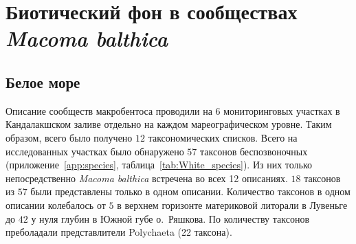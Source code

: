 		\chapter{Биотический фон в сообществах {\it Macoma balthica}}

	\section{Белое море}
Описание сообществ макробентоса проводили на 6 мониторинговых участках в Кандалакшском заливе отдельно на каждом мареографическом уровне. 
Таким образом, всего было получено $12$ таксономических списков.
Всего на  исследованных участках было обнаружено $57$ таксонов беспозвоночных (приложение~\ref{app:species}, таблица~\ref{tab:White_species}).
Из них только непосредственно {\it Macoma balthica} встречена во всех 12 описаниях.
$18$ таксонов из $57$ были представлены только в одном описании.
Количество таксонов в одном описании колебалось от $5$ в верхнем горизонте материковой литорали в Лувеньге до $42$ у нуля глубин в Южной губе о.~Ряшкова.
По количеству таксонов преболадали представлители Polychaeta (22 таксона).


